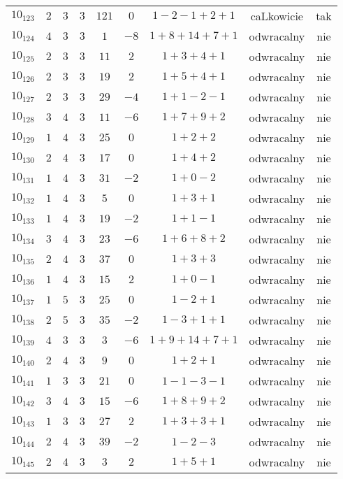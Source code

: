 \begin{longtable}{ccccccccc}
$10_{123}$ & $2$ & $3$ & $3$ & $121$ & $0$ & $1-2-1+2+1$ & caLkowicie & tak \\
$10_{124}$ & $4$ & $3$ & $3$ & $1$ & $-8$ & $1+8+14+7+1$ & odwracalny & nie \\
$10_{125}$ & $2$ & $3$ & $3$ & $11$ & $2$ & $1+3+4+1$ & odwracalny & nie \\
$10_{126}$ & $2$ & $3$ & $3$ & $19$ & $2$ & $1+5+4+1$ & odwracalny & nie \\
$10_{127}$ & $2$ & $3$ & $3$ & $29$ & $-4$ & $1+1-2-1$ & odwracalny & nie \\
$10_{128}$ & $3$ & $4$ & $3$ & $11$ & $-6$ & $1+7+9+2$ & odwracalny & nie \\
$10_{129}$ & $1$ & $4$ & $3$ & $25$ & $0$ & $1+2+2$ & odwracalny & nie \\
$10_{130}$ & $2$ & $4$ & $3$ & $17$ & $0$ & $1+4+2$ & odwracalny & nie \\
$10_{131}$ & $1$ & $4$ & $3$ & $31$ & $-2$ & $1+0-2$ & odwracalny & nie \\
$10_{132}$ & $1$ & $4$ & $3$ & $5$ & $0$ & $1+3+1$ & odwracalny & nie \\
$10_{133}$ & $1$ & $4$ & $3$ & $19$ & $-2$ & $1+1-1$ & odwracalny & nie \\
$10_{134}$ & $3$ & $4$ & $3$ & $23$ & $-6$ & $1+6+8+2$ & odwracalny & nie \\
$10_{135}$ & $2$ & $4$ & $3$ & $37$ & $0$ & $1+3+3$ & odwracalny & nie \\
$10_{136}$ & $1$ & $4$ & $3$ & $15$ & $2$ & $1+0-1$ & odwracalny & nie \\
$10_{137}$ & $1$ & $5$ & $3$ & $25$ & $0$ & $1-2+1$ & odwracalny & nie \\
$10_{138}$ & $2$ & $5$ & $3$ & $35$ & $-2$ & $1-3+1+1$ & odwracalny & nie \\
$10_{139}$ & $4$ & $3$ & $3$ & $3$ & $-6$ & $1+9+14+7+1$ & odwracalny & nie \\
$10_{140}$ & $2$ & $4$ & $3$ & $9$ & $0$ & $1+2+1$ & odwracalny & nie \\
$10_{141}$ & $1$ & $3$ & $3$ & $21$ & $0$ & $1-1-3-1$ & odwracalny & nie \\
$10_{142}$ & $3$ & $4$ & $3$ & $15$ & $-6$ & $1+8+9+2$ & odwracalny & nie \\
$10_{143}$ & $1$ & $3$ & $3$ & $27$ & $2$ & $1+3+3+1$ & odwracalny & nie \\
$10_{144}$ & $2$ & $4$ & $3$ & $39$ & $-2$ & $1-2-3$ & odwracalny & nie \\
$10_{145}$ & $2$ & $4$ & $3$ & $3$ & $2$ & $1+5+1$ & odwracalny & nie \\

\end{longtable}
